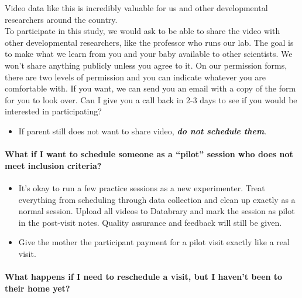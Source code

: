 \documentclass[
  12pt,
]{book}
\providecommand{\tightlist}{%
  \setlength{\itemsep}{0pt}\setlength{\parskip}{0pt}}
\begin{document}
Video data like this is incredibly valuable for us and other developmental researchers around the country.\\
To participate in this study, we would ask to be able to share the video with other developmental researchers, like the professor who runs our lab. The goal is to make what we learn from you and your baby available to other scientists. We won't share anything publicly unless you agree to it. On our permission forms, there are two levels of permission and you can indicate whatever you are comfortable with. If you want, we can send you an email with a copy of the form for you to look over. Can I give you a call back in 2-3 days to see if you would be interested in participating?

\begin{itemize}
\tightlist
\item
  If parent still does not want to share video, \emph{\textbf{do not schedule them}}.
\end{itemize}

\hypertarget{what-if-i-want-to-schedule-someone-as-a-pilot-session-who-does-not-meet-inclusion-criteria}{%
\paragraph*{What if I want to schedule someone as a ``pilot'' session who does not meet inclusion criteria?}\label{what-if-i-want-to-schedule-someone-as-a-pilot-session-who-does-not-meet-inclusion-criteria}}

\begin{itemize}
\tightlist
\item
  It's okay to run a few practice sessions as a new experimenter. Treat everything from scheduling through data collection and clean up exactly as a normal session. Upload all videos to Databrary and mark the session as pilot in the post-visit notes. Quality assurance and feedback will still be given.
\item
  Give the mother the participant payment for a pilot visit exactly like a real visit.
\end{itemize}

\hypertarget{what-happens-if-i-need-to-reschedule-a-visit-but-i-havent-been-to-their-home-yet}{%
\paragraph*{What happens if I need to reschedule a visit, but I haven't been to their home yet?}\label{what-happens-if-i-need-to-reschedule-a-visit-but-i-havent-been-to-their-home-yet}}
\end{document}
